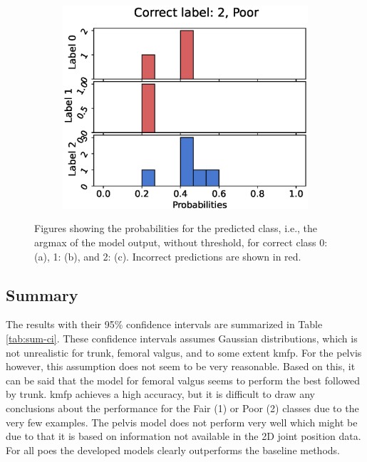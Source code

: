 \begin{figure}
\begin{subfigure}[t]{0.33\textwidth}
    \includegraphics[width=\textwidth]{files/figs/res/kmfp/pc2-rb.eps}
    \caption{}
    \label{fig:kmfp-pc2}
  \end{subfigure}

  \caption{Figures showing the probabilities for the predicted class, i.e., the argmax of the model output, without threshold, for correct class 0: (a), 1: (b), and 2: (c). Incorrect predictions are shown in red.}
  \label{fig:kmfp-pc}
\end{figure}

\FloatBarrier
\subsection{Summary}
The results with their 95\% confidence intervals are summarized in Table \ref{tab:sum-ci}. These confidence intervals assumes Gaussian distributions, which is not unrealistic for trunk, femoral valgus, and to some extent \gls{kmfp}. For the pelvis however, this assumption does not seem to be very reasonable. Based on this, it can be said that the model for femoral valgus seems to perform the best followed by trunk. \gls{kmfp} achieves a high accuracy, but it is difficult to draw any conclusions about the performance for the Fair (1) or Poor (2) classes due to the very few examples. The pelvis model does not perform very well which might be due to that it is based on information not available in the 2D joint position data. For all \glspl{poe} the developed models clearly outperforms the baseline methods.

